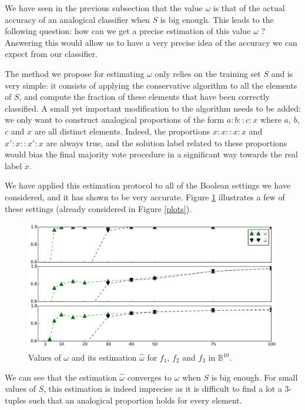 We have seen in the previous subsection that the value $\omega$ is that of the actual
accuracy of an analogical classifier when $S$ is big enough. This leads to the
following question: how can we get a precise estimation of this value $\omega$
? Answering this would allow us to have a very precise idea of the accuracy we
can expect from our classifier.

The method we propose for estimating $\omega$ only relies on the training set $S$
and is very simple: it consists of applying the conservative algorithm to all
the elements of $S$, and compute the fraction of these elements that have been
correctly classified. A small yet important modification to the algorithm needs
to be added: we only want to construct analogical proportions of the form $a :
b :: c : x$ where $a$, $b$, $c$ and $x$ are all distinct elements. Indeed, the
proportions $x : x :: x : x$ and $x' : x :: x' : x$ are always true, and the
solution label related to these proportions would bias the final majority vote
procedure in a significant way towards the real label $\dot{x}$.

We have applied this estimation protocol to all of the Boolean settings we have
considered, and it has shown to be very accurate. Figure \ref{omegaplots}
illustrates a few of these settings (already considered in Figure \ref{plots}).
\begin{figure}
  \caption{Values of $\omega$ and its estimation $\hat{\omega}$ for $f_1$, $f_2$ and $f_3$ in
  $\mathbb{B}^{10}$.}
\label{omegaplots}
\includegraphics[width=\linewidth]{figures/ecai_estimation_omega.pdf}
\end{figure}
We can see that the estimation $\hat{\omega}$ converges to $\omega$ when $S$ is
big enough. For small values of $S$, this estimation is indeed imprecise as it
is difficult to find a lot a 3-tuples such that an analogical proportion holds
for every element.


